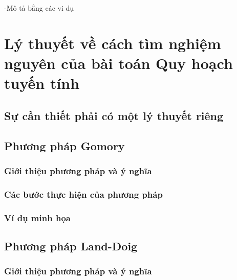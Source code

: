 \documentclass[12pt,a4paper]{report}
\begin{document}
-Mô tả bằng các vi dụ

\section{Lý thuyết về cách tìm nghiệm nguyên của bài toán Quy hoạch tuyến tính}


\subsection{Sự cần thiết phải có một lý thuyết riêng}

\subsection{Phương pháp Gomory}

\subsubsection{Giới thiệu phương pháp và ý nghĩa}

\subsubsection{Các bước thực hiện của phương pháp}

\subsubsection{Ví dụ minh họa}


\subsection{Phương pháp Land-Doig}

\subsubsection{Giới thiệu phương pháp và ý nghĩa}
\end{document}
